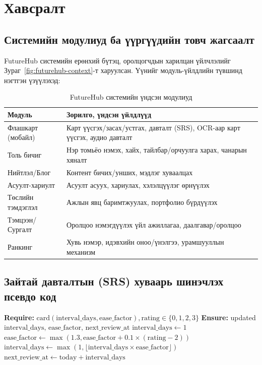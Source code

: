 
\chapter*{Хавсралт}

\section*{Системийн модулиуд ба үүргүүдийн товч жагсаалт}

FutureHub системийн ерөнхий бүтэц, оролцогчдын харилцан үйлчлэлийг Зураг~\ref{fig:futurehub-context}-т харуулсан. Үүнийг модуль-үйлдлийн түвшинд нэгтгэн үзүүлэхэд:

\begin{table}[H]
\centering
\caption{FutureHub системийн үндсэн модулиуд}
\label{tab:modules}
\small
\begin{tabular}{p{4cm}p{10cm}}
\toprule
\textbf{Модуль} & \textbf{Зорилго, үндсэн үйлдлүүд} \\
\midrule
Флашкарт (мобайл) & Карт үүсгэх/засах/устгах, давталт (SRS), OCR-аар карт үүсгэх, аудио давталт \\
Толь бичиг & Нэр томьёо нэмэх, хайх, тайлбар/орчуулга харах, чанарын хяналт \\
Нийтлэл/Блог & Контент бичих/унших, мэдлэг хуваалцах \\
Асуулт-хариулт & Асуулт асуух, хариулах, хэлэлцүүлэг өрнүүлэх \\
Төслийн тэмдэглэл & Ажлын явц баримтжуулах, портфолио бүрдүүлэх \\
Тэмцээн/Сургалт & Оролцоо нэмэгдүүлэх үйл ажиллагаа, даалгавар/оролцоо \\
Ранкинг & Хувь нэмэр, идэвхийн оноо/үнэлгээ, урамшууллын механизм \\
\bottomrule
\end{tabular}
\end{table}


\section*{Зайтай давталтын (SRS) хуваарь шинэчлэх псевдо код}

\begin{algorithm}[H]
\caption{Флашкартын дараагийн давталт төлөвлөх (ерөнхий)}
\label{alg:srs_schedule}
\begin{algorithmic}[1]
\State \textbf{Require:} $\text{card}(\text{interval\_days}, \text{ease\_factor}), \text{rating} \in \{0,1,2,3\}$
\State \textbf{Ensure:} updated $\text{interval\_days, ease\_factor, next\_review\_at}$
    \State $\text{interval\_days} \gets 1$
\Else
    \State $\text{ease\_factor} \gets \max(1.3, \text{ease\_factor} + 0.1 \times (\text{rating}-2))$
    \State $\text{interval\_days} \gets \max(1, \lfloor \text{interval\_days} \times \text{ease\_factor} \rfloor)$
\EndIf
\State $\text{next\_review\_at} \gets \text{today} + \text{interval\_days}$
\end{algorithmic}
\end{algorithm}

